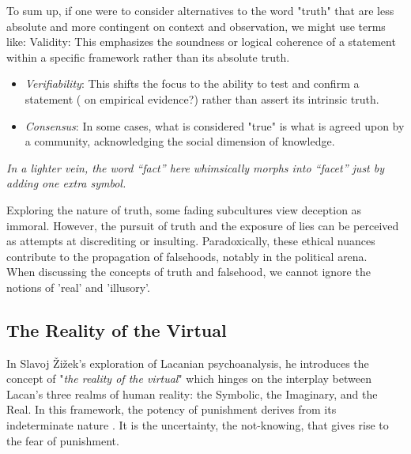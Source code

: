 \documentclass[11pt,a4]{article}
\begin{document}
To sum up, if one were to consider alternatives to the word "truth" that are less absolute and more contingent on context and observation, we might use terms like:
Validity: This emphasizes the soundness or logical coherence of a statement within a specific framework rather than its absolute truth.

\begin{itemize}

    \item \textit{Verifiability}: This shifts the focus to the ability to test and confirm a statement ( on empirical evidence?) rather than assert its intrinsic truth.
    \item \textit{Consensus}: In some cases, what is considered "true" is what is agreed upon by a community, acknowledging the social dimension of knowledge.

\end{itemize}

\textit{In a lighter vein, the word “fact” here whimsically morphs into “facet” just by adding one extra symbol.
} \\
\par

Exploring the nature of truth, some fading subcultures view deception as immoral. However, the pursuit of truth and the exposure of lies can be perceived as attempts at discrediting or insulting. Paradoxically, these ethical nuances contribute to the propagation of falsehoods, notably in the political arena.\\

When discussing the concepts of truth and falsehood, we cannot ignore the notions of 'real' and 'illusory'.

    \subsection{The Reality of the Virtual}

        In Slavoj Žižek's exploration of Lacanian psychoanalysis, he introduces the concept of "\textit{the reality of the virtual}" which hinges on the interplay between Lacan's three realms of human reality: the Symbolic, the Imaginary, and the Real.
        In this framework, the potency of punishment derives from its indeterminate nature \cite{Borretzen2012-tx}. It is the uncertainty, the not-knowing, that gives rise to the fear of punishment.
\end{document}
